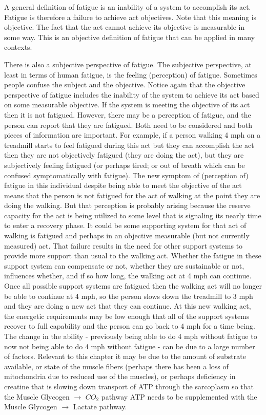 A general definition of fatigue is an inability of a system\footnotemark{} to accomplish its act. Fatigue is therefore a failure to achieve act objectives. Note that this meaning is objective. The fact that the act cannot achieve its objective is measurable in some way. This is an objective definition of fatigue that can be applied in many contexts.

There is also a subjective perspective of fatigue. The subjective perspective, at least in terms of human fatigue, is the feeling (perception) of fatigue. Sometimes people confuse the subject and the objective. Notice again that the objective perspective of fatigue includes the inability of the system to achieve its act based on some measurable objective. If the system is meeting the objective of its act then it is not fatigued. However, there may be a perception of fatigue, and the person can report that they are fatigued. Both need to be considered and both pieces of information are important. For example, if a person walking 4 mph on a treadmill starts to feel fatigued during this act but they can accomplish the act then they are not objectively fatigued (they are doing the act), but they are subjectively feeling fatigued (or perhaps tired; or out of breath which can be confused symptomatically with fatigue). The new symptom of (perception of) fatigue in this individual despite being able to meet the objective of the act means that the person is not fatigued for the act of walking at the point they are doing the walking. But that perception is probably arising because the reserve capacity for the act is being utilized to some level that is signaling its nearly time to enter a recovery phase. It could be some supporting system for that act of walking is fatigued and perhaps in an objective measurable (but not currently measured) act. That failure results in the need for other support systems to provide more support than usual to the walking act. Whether the fatigue in these support system can compensate or not, whether they are sustainable or not, influences whether, and if so how long, the walking act at 4 mph can continue. Once all possible support systems are fatigued then the walking act will no longer be able to continue at 4 mph, so the person slows down the treadmill to 3 mph and they are doing a new act that they can continue. At this new walking act, the energetic requirements may be low enough that all of the support systems recover to full capability and the person can go back to 4 mph for a time being. The change in the ability - previously being able to do 4 mph without fatigue to now not being able to do 4 mph without fatigue - can be due to a large number of factors. Relevant to this chapter it may be due to the amount of substrate available, or state of the muscle fibers (perhaps there has been a loss of mitochondria due to reduced use of the muscles), or perhaps deficiency in creatine that is slowing down transport of ATP through the sarcoplasm so that the Muscle Glycogen $\rightarrow$ $CO_2$ pathway ATP needs to be supplemented with the Muscle Glycogen $\rightarrow$ Lactate pathway.

